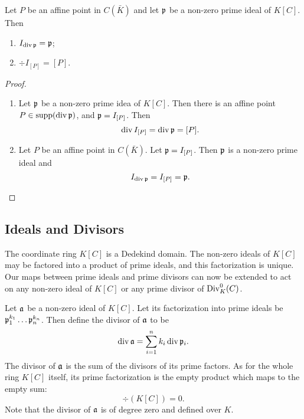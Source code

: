 \begin{proposition}
  Let $P$ be an affine point in $C(\bar K)$ and let $\frak p$ be a non-zero prime ideal of $K[C]$. Then
  \begin{enumerate}[label=(\roman*)]
    \item $I_{\div \frak p} = \frak p$;
    \item $\div I_{[P]} = [P]$.
  \end{enumerate}
\end{proposition}
\begin{proof}
  \begin{enumerate}[label=(\roman*)]
    \item
      Let $\frak p$ be a non-zero prime idea of $K[C]$.
      Then there is an affine point $P \in \supp(\div \frak p)$,
      and $\frak p = I_{[P]}$. Then
      \[ \div I_{[P]} = \div \frak p = [P]. \]
    
    \item
      Let $P$ be an affine point in $C(\bar K)$.
      Let $\frak p = I_{[P]}$. Then $\frak p$ is a non-zero prime ideal and
      \[ I_{\div \frak p} = I_{[P]} = \frak p. \]
  \end{enumerate}
\end{proof}




\subsection{Ideals and Divisors}

The coordinate ring $K[C]$ is a Dedekind domain.
The non-zero ideals of $K[C]$ may be factored into a product of prime ideals, and this factorization is unique.
Our maps between prime ideals and prime divisors can now be extended to act on any non-zero ideal of $K[C]$ or any prime divisor of $\Div_K^0(C)$.

Let $\frak a$ be a non-zero ideal of $K[C]$.
Let its factorization into prime ideals be $\frak p_1^{k_1} \dots \frak p_n^{k_n}$.
Then define the divisor of $\frak a$ to be
\[ \div \frak a = \sum_{i=1}^n k_i \div \frak p_i. \]
The divisor of $\frak a$ is the sum of the divisors of its prime factors.
As for the whole ring $K[C]$ itself,
its prime factorization is the empty product which maps to the empty sum:
  \[ \div (K[C]) = 0. \]
Note that the divisor of $\frak a$ is of degree zero and defined over $K$.

